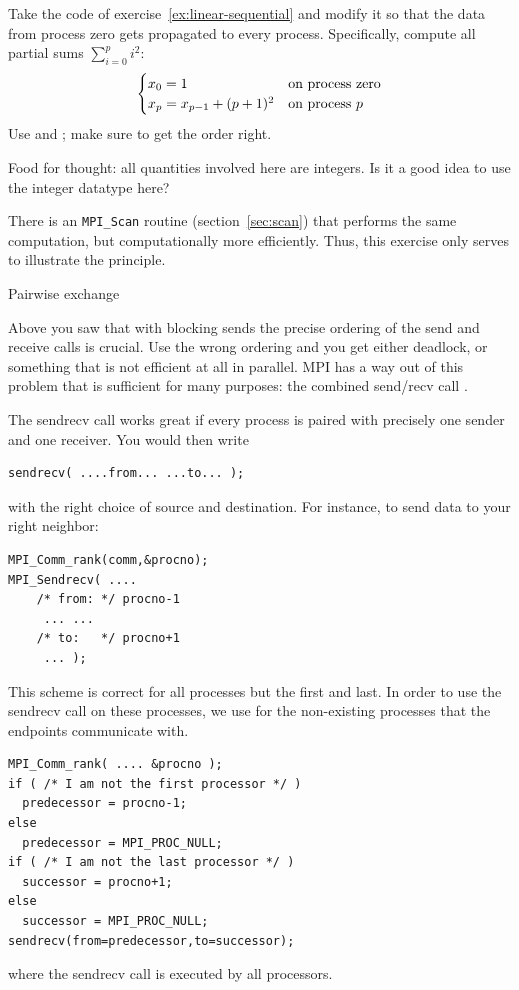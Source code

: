 \begin{exercise}
  \label{ex:bucket-block}
  Take the code of exercise~\ref{ex:linear-sequential} and modify it
  so that the data from process zero gets propagated to every
  process. Specifically, compute all partial sums $\sum_{i=0}^pi^2$:
  \[ 
  \begin{cases}
    x_0 = 1&\hbox{on process zero}\\
    x_p = x_{p-1}+(p+1)^2 & \hbox{on process $p$}\\
  \end{cases}
  \]
  Use  and ; make sure to get the order right.

  Food for thought: all quantities involved here are integers. Is it a good idea to
  use the integer datatype here?

\end{exercise}

\begin{remark}
  There is an \lstinline{MPI_Scan} routine (section~\ref{sec:scan})
  that performs the same computation,
  but computationally more efficiently. Thus, this exercise only serves to illustrate
  the principle.
\end{remark}


 {Pairwise exchange}
\label{sec:send-recv}

Above you saw that with blocking sends the precise ordering of the
send and receive calls is crucial. Use the wrong ordering and you get
either deadlock, or something that is not efficient at all in
parallel. MPI has a way out of this problem that is sufficient for
many purposes: the combined send/recv call .

The sendrecv call works great if every process is paired
with precisely one sender and one receiver.
You would then write
\begin{lstlisting}
sendrecv( ....from... ...to... );
\end{lstlisting}
with the right choice of source and destination. For instance, to send
data to your right neighbor:
\begin{lstlisting}
MPI_Comm_rank(comm,&procno);
MPI_Sendrecv( .... 
    /* from: */ procno-1
     ... ... 
    /* to:   */ procno+1
     ... );
\end{lstlisting}
This scheme is correct for all processes but the first and last. 
In order to use the sendrecv call on these processes,
we use  for the non-existing
processes that the endpoints communicate with.
\begin{lstlisting}
MPI_Comm_rank( .... &procno );
if ( /* I am not the first processor */ )
  predecessor = procno-1;
else
  predecessor = MPI_PROC_NULL;
if ( /* I am not the last processor */ )
  successor = procno+1;
else
  successor = MPI_PROC_NULL;
sendrecv(from=predecessor,to=successor);
\end{lstlisting}
where the sendrecv call is executed by all processors.

